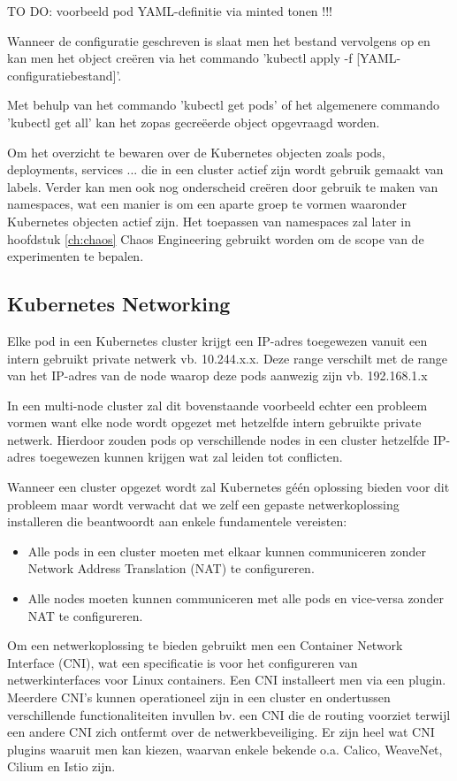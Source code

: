 TO DO: voorbeeld pod YAML-definitie via minted tonen !!! 

Wanneer de configuratie geschreven is slaat men het bestand vervolgens op en kan men het object creëren via het commando 'kubectl apply -f [YAML-configuratiebestand]'. 

Met behulp van het commando 'kubectl get pods' of het algemenere commando 'kubectl get all' kan het zopas gecreëerde object opgevraagd worden. 

Om het overzicht te bewaren over de Kubernetes objecten zoals pods, deployments, services ... die in een cluster actief zijn wordt gebruik gemaakt van labels. Verder kan men ook nog onderscheid creëren door gebruik te maken van namespaces, wat een manier is om een aparte groep te vormen waaronder Kubernetes objecten actief zijn. Het toepassen van namespaces zal later in hoofdstuk \ref{ch:chaos} Chaos Engineering gebruikt worden om de scope van de experimenten te bepalen. 

\subsection{Kubernetes Networking}

Elke pod in een Kubernetes cluster krijgt een IP-adres toegewezen vanuit een intern gebruikt private netwerk vb. 10.244.x.x. 
Deze range verschilt met de range van het IP-adres van de node waarop deze pods aanwezig zijn vb. 192.168.1.x

In een multi-node cluster zal dit bovenstaande voorbeeld echter een probleem vormen want elke node wordt opgezet met hetzelfde intern gebruikte private netwerk. Hierdoor zouden pods op verschillende nodes in een cluster hetzelfde IP-adres toegewezen kunnen krijgen wat zal leiden tot conflicten.

Wanneer een cluster opgezet wordt zal Kubernetes géén oplossing bieden voor dit probleem maar wordt verwacht dat we zelf een gepaste netwerkoplossing installeren die beantwoordt aan enkele fundamentele vereisten: 
\begin{itemize}
    \item Alle pods in een cluster moeten met elkaar kunnen communiceren zonder Network Address Translation (NAT) te configureren.
    \item Alle nodes moeten kunnen communiceren met alle pods en vice-versa zonder NAT te configureren.
\end{itemize} 

Om een netwerkoplossing te bieden gebruikt men een Container Network Interface (CNI), wat een specificatie is voor het configureren van netwerkinterfaces voor Linux containers. Een CNI installeert men via een plugin. Meerdere CNI's kunnen operationeel zijn in een cluster en ondertussen verschillende functionaliteiten invullen bv. een CNI die de routing voorziet terwijl een andere CNI zich ontfermt over de netwerkbeveiliging. Er zijn heel wat CNI plugins waaruit men kan kiezen, waarvan enkele bekende o.a. Calico, WeaveNet, Cilium en Istio zijn. \autocite{Power2019}

